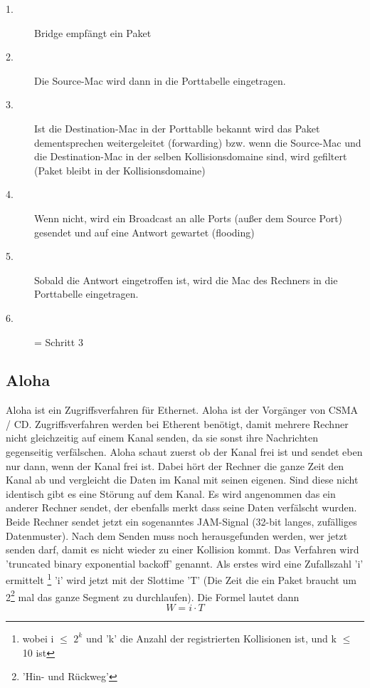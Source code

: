 \documentclass[a4paper,10pt]{scrartcl}
\begin{document}
            \begin{description}
                \item[1.] Bridge empfängt ein Paket
                \item[2.] Die Source-Mac wird dann in die Porttabelle eingetragen.
                \item[3.] Ist die Destination-Mac in der Porttablle bekannt wird das Paket dementsprechen weitergeleitet (forwarding) bzw. wenn die Source-Mac und die Destination-Mac in der
                selben Kollisionsdomaine sind, wird gefiltert (Paket bleibt in der Kollisionsdomaine)
                \item[4.] Wenn nicht, wird ein Broadcast an alle Ports (außer dem Source Port) gesendet und auf eine Antwort gewartet (flooding)
                \item[5.] Sobald die Antwort eingetroffen ist, wird die Mac des Rechners in die Porttabelle eingetragen.
                \item[6.] = Schritt 3 
            \end{description}
              
        \subsection{Aloha}
            Aloha ist ein Zugriffsverfahren für Ethernet. Aloha ist der Vorgänger von CSMA / CD. Zugriffsverfahren werden bei Etherent benötigt, damit mehrere Rechner nicht gleichzeitig
            auf einem Kanal senden, da sie sonst ihre Nachrichten gegenseitig verfälschen. 
            Aloha schaut zuerst ob der Kanal frei ist und sendet eben nur dann, wenn der Kanal frei ist. 
            Dabei hört der Rechner die ganze Zeit den Kanal ab und vergleicht die Daten im Kanal mit seinen eigenen. Sind diese nicht identisch gibt es eine Störung auf dem Kanal. 
            Es wird angenommen das ein anderer Rechner sendet, der ebenfalls merkt dass seine Daten verfälscht wurden. 
            Beide Rechner sendet jetzt ein sogenanntes JAM-Signal (32-bit langes, zufälliges Datenmuster). Nach dem Senden muss noch herausgefunden werden, wer jetzt senden darf, damit es nicht wieder 
            zu einer Kollision kommt. Das Verfahren wird 'truncated binary exponential backoff' genannt. Als erstes wird eine Zufallszahl 'i' ermittelt 
            \footnote{wobei i $\leq$ $2^k$ und 'k' die Anzahl der registrierten Kollisionen ist, und k $\leq$ 10 ist}
            'i' wird jetzt mit der Slottime 'T' (Die Zeit die ein Paket braucht um 2\footnote{'Hin- und Rückweg'} mal das ganze Segment zu durchlaufen). Die Formel lautet dann 
            \[ W = i \cdot T \] 
\end{document}
